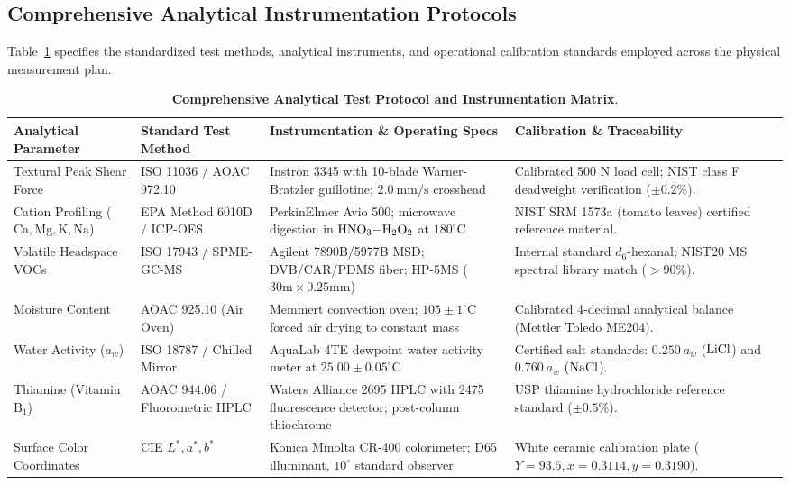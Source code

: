 \documentclass[10pt,a4paper]{article}
\begin{document}
\subsection{Comprehensive Analytical Instrumentation Protocols}
Table~\ref{tab:analytical_inventory_expanded} specifies the standardized test methods, analytical instruments, and operational calibration standards employed across the physical measurement plan.

\begin{table}[H]
\centering
\footnotesize
\setlength{\tabcolsep}{3.5pt}
\caption{\textbf{Comprehensive Analytical Test Protocol and Instrumentation Matrix}.}
\label{tab:analytical_inventory_expanded}
\begin{tabularx}{\linewidth}{p{3.2cm}p{3.6cm}p{4.2cm}>{\raggedright\arraybackslash}X}
\toprule
\textbf{Analytical Parameter} & \textbf{Standard Test Method} & \textbf{Instrumentation \& Operating Specs} & \textbf{Calibration \& Traceability} \\
\midrule
Textural Peak Shear Force & ISO 11036 / AOAC 972.10 & Instron 3345 with 10-blade Warner-Bratzler guillotine; $2.0\ \mathrm{mm/s}$ crosshead & Calibrated 500 N load cell; NIST class F deadweight verification ($\pm 0.2\%$). \\
Cation Profiling ($\mathrm{Ca, Mg, K, Na}$) & EPA Method 6010D / ICP-OES & PerkinElmer Avio 500; microwave digestion in $\ce{HNO3-H2O2}$ at $180^\circ\mathrm{C}$ & NIST SRM 1573a (tomato leaves) certified reference material. \\
Volatile Headspace VOCs & ISO 17943 / SPME-GC-MS & Agilent 7890B/5977B MSD; DVB/CAR/PDMS fiber; HP-5MS ($30\mathrm{m} \times 0.25\mathrm{mm}$) & Internal standard $d_6$-hexanal; NIST20 MS spectral library match ($> 90\%$). \\
Moisture Content & AOAC 925.10 (Air Oven) & Memmert convection oven; $105 \pm 1^\circ\mathrm{C}$ forced air drying to constant mass & Calibrated 4-decimal analytical balance (Mettler Toledo ME204). \\
Water Activity ($a_w$) & ISO 18787 / Chilled Mirror & AquaLab 4TE dewpoint water activity meter at $25.00 \pm 0.05^\circ\mathrm{C}$ & Certified salt standards: $0.250\ a_w$ ($\ce{LiCl}$) and $0.760\ a_w$ ($\ce{NaCl}$). \\
Thiamine (Vitamin $\mathrm{B}_1$) & AOAC 944.06 / Fluorometric HPLC & Waters Alliance 2695 HPLC with 2475 fluorescence detector; post-column thiochrome & USP thiamine hydrochloride reference standard ($\pm 0.5\%$). \\
Surface Color Coordinates & CIE $L^*, a^*, b^*$ & Konica Minolta CR-400 colorimeter; D65 illuminant, $10^\circ$ standard observer & White ceramic calibration plate ($Y=93.5, x=0.3114, y=0.3190$). \\
\bottomrule
\end{tabularx}
\end{table}
\end{document}
